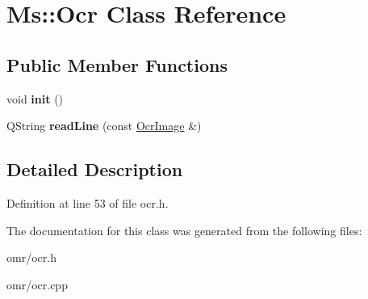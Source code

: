 \hypertarget{class_ms_1_1_ocr}{}\section{Ms\+:\+:Ocr Class Reference}
\label{class_ms_1_1_ocr}
\subsection*{Public Member Functions}
\begin{DoxyCompactItemize}
\item 
\mbox{\label{class_ms_1_1_ocr_a9529f5b07b24cc3cc1a67f8763ebaf46}} 
void {\bfseries init} ()
\item 
\mbox{\label{class_ms_1_1_ocr_af12c92dbb2ffcfe84d001bc7d3b70b42}} 
Q\+String {\bfseries read\+Line} (const \hyperlink{struct_ms_1_1_ocr_image}{Ocr\+Image} \&)
\end{DoxyCompactItemize}


\subsection{Detailed Description}


Definition at line 53 of file ocr.\+h.



The documentation for this class was generated from the following files\+:\begin{DoxyCompactItemize}
\item 
omr/ocr.\+h\item 
omr/ocr.\+cpp\end{DoxyCompactItemize}

